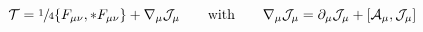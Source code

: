 \begin{equation}
 \mathcal{T} = \sfrac{1}{4}\{F_{\mu\nu},{*F_{\mu\nu}}\}+
 \nabla_{\mu}\mathcal{J}_{\mu}\qquad\text{with}\qquad
 \nabla_\mu\mathcal{J}_\mu=\partial_\mu\mathcal{J}_\mu+
 [\mathcal{A}_\mu,\mathcal{J}_\mu]
\end{equation}

